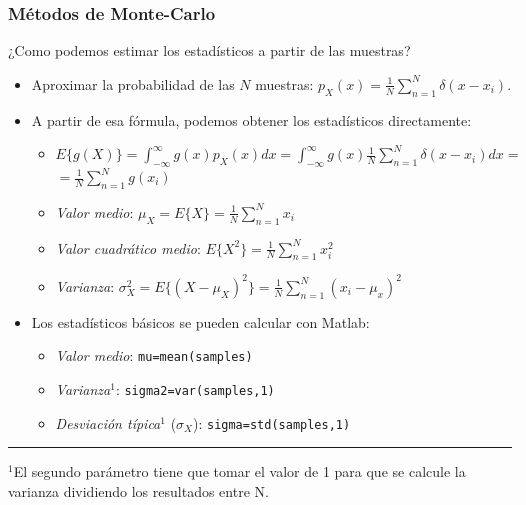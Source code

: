 \documentclass{beamer}
\numberwithin{section}{part}
\begin{document}
\begin{frame}
  \frametitle{Métodos de Monte-Carlo}
  \footnotesize
  
  \alert{¿Como podemos estimar los estadísticos a partir de las muestras?}
  \begin{itemize}
    \item Aproximar la probabilidad de las $N$ muestras: $p_X(x)=\frac{1}{N}\sum_{n=1}^{N} \delta(x-x_i)$.  
    \item A partir de esa fórmula, podemos obtener los estadísticos directamente:
    \begin{itemize}
      \footnotesize
      \item  $E\{g(X)\}\!=\!\!\int_{-\infty}^\infty g(x)p_X(x)dx\!=\!\!\int_{-\infty}^\infty g(x) \frac{1}{N}\!\!\sum_{n=1}^{N} \delta(x-x_i) dx\!=$  
      \vspace{0.1cm}
      \hspace{1.15cm}$=\!\frac{1}{N}\sum_{n=1}^{N} \!g(x_i)$
      \vspace{0.1cm}
      \item \emph{Valor medio}: $\mu_X=E\{X\}=\!\frac{1}{N}\sum_{n=1}^{N} \! x_i$
      \vspace{0.1cm}
      \item \emph{Valor cuadrático medio}: $E\{X^2\}=\!\frac{1}{N}\sum_{n=1}^{N} \! x_i^2$
      \vspace{0.1cm}
      \item \emph{Varianza}: $\sigma_X^2=E\{(X-\mu_X)^2\}=\!\frac{1}{N}\sum_{n=1}^{N} \! (x_i-\mu_x)^2$
    \end{itemize}
    \item Los estadísticos básicos se pueden calcular con Matlab:
    \begin{itemize}
      \footnotesize
      \item \emph{Valor medio}: \color{blue}\texttt{mu=mean(samples)}\color{black}
      \item \emph{Varianza}$^1$: \color{blue}\texttt{sigma2=var(samples,1)}\color{black}
      \item \emph{Desviación típica}$^1$ ($\sigma_X$): \color{blue}\texttt{sigma=std(samples,1)}\color{black}
    \end{itemize}
  \end{itemize}
  \vspace{-0.2cm}
  \rule{11cm}{0.04ex}
  \scriptsize
  $^1$El segundo parámetro tiene que tomar el valor de 1 para que se calcule la varianza dividiendo los resultados entre N.
\end{frame}

  
\end{document}
